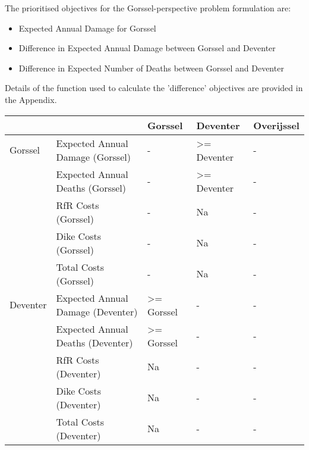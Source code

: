 The prioritised objectives for the Gorssel-perspective problem formulation are:
\begin{itemize}
    \item Expected Annual Damage for Gorssel
    \item Difference in Expected Annual Damage between Gorssel and Deventer
    \item Difference in Expected Number of Deaths between Gorssel and Deventer
\end{itemize}
Details of the function used to calculate the 'difference' objectives are provided in the Appendix.




\begin{table}[h!]
\begin{tabular}{ll|lll}
\hline
         &                                   & Gorssel                 & Deventer                 & Overijssel \\ \hline
Gorssel  & Expected Annual Damage (Gorssel)  & -                       & \textgreater{}= Deventer & -          \\
         & Expected Annual Deaths (Gorssel)  & -                       & \textgreater{}= Deventer & -          \\
         & RfR Costs (Gorssel)               & -                       & Na                       & -          \\
         & Dike Costs (Gorssel)              & -                       & Na                       & -          \\
         & Total Costs (Gorssel)             & -                       & Na                       & -          \\
Deventer & Expected Annual Damage (Deventer) & \textgreater{}= Gorssel & -                        & -          \\
         & Expected Annual Deaths (Deventer) & \textgreater{}= Gorssel & -                        & -          \\
         & RfR Costs (Deventer)              & Na                      & -                        & -          \\
         & Dike Costs (Deventer)             & Na                      & -                        & -          \\
         & Total Costs (Deventer)            & Na                      & -                        & -          \\

\end{tabular}
\end{table}

